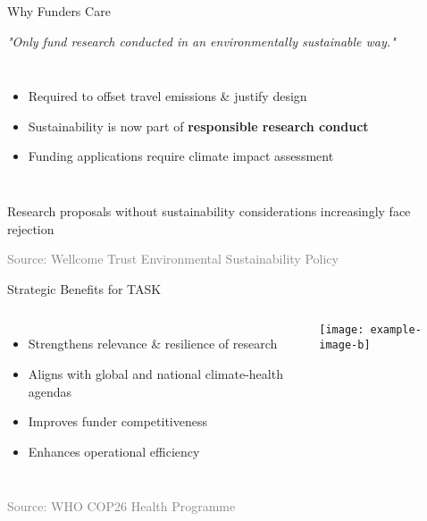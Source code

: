 \documentclass{beamer}
\newcommand{\highlight}[1]{\textcolor{taskred}{\textbf{#1}}}
\newcommand{\source}[1]{\vspace{0.3cm}\hfill\scriptsize\textcolor{gray}{Source: #1}}
\newenvironment{actionblock}{\begin{tcolorbox}[colback=taskgreen!20, colframe=taskgreen, title=\textbf{Action Item}]}{\end{tcolorbox}}
\begin{document}
\begin{frame}{Why Funders Care}
\begin{tcolorbox}[colback=white, colframe=taskblue, title=\textbf{Wellcome Trust Policy}]
\centering
\textit{"Only fund research conducted in an environmentally sustainable way."}
\end{tcolorbox}

\vspace{0.5cm}
\begin{columns}
\centering
{}
\begin{itemize}[spacing=0.5em]
    \item Required to offset travel emissions \& justify design
    \item Sustainability is now part of \highlight{responsible research conduct}
    \item Funding applications require climate impact assessment
\end{itemize}
\end{columns}

\begin{actionblock}
Research proposals without sustainability considerations increasingly face rejection
\end{actionblock}

\source{Wellcome Trust Environmental Sustainability Policy}
\end{frame}

\begin{frame}{Strategic Benefits for TASK}
\begin{columns}
\begin{itemize}[spacing=1em]
    \item {} Strengthens relevance \& resilience of research
    \item {} Aligns with global and national climate-health agendas
    \item {} Improves funder competitiveness
    \item {} Enhances operational efficiency
\end{itemize}
\texttt{[image: example-image-b]} %
\end{columns}


\source{WHO COP26 Health Programme}
\end{frame}
\end{document}
